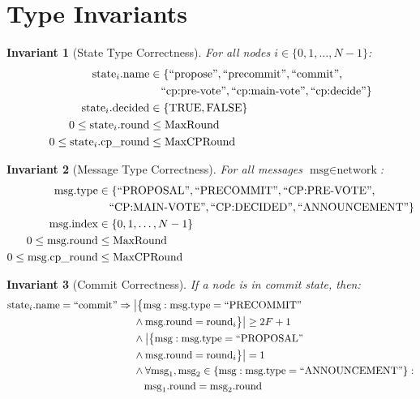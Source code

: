 \documentclass[11pt,a4paper,twoside]{article}
\newtheorem{invariant}{Invariant}[section]
\begin{document}
\section{Type Invariants}

\begin{invariant}[State Type Correctness]
For all nodes $i \in \{0, 1, \ldots, N-1\}$:
\begin{align}
\text{state}_i.\text{name} &\in \{\text{``propose''}, \text{``precommit''}, \text{``commit'',} \notag \\
& \quad \text{``cp:pre-vote''}, \text{``cp:main-vote''}, \text{``cp:decide''}\} \\
\text{state}_i.\text{decided} &\in \{\text{TRUE}, \text{FALSE}\} \\
0 \leq \text{state}_i.\text{round} &\leq \text{MaxRound} \\
0 \leq \text{state}_i.\text{cp\_round} &\leq \text{MaxCPRound}
\end{align}
\end{invariant}

\begin{invariant}[Message Type Correctness]
For all messages $\text{msg} \in \text{network}$:
\begin{align}
\text{msg.type} &\in \{\text{``PROPOSAL''}, \text{``PRECOMMIT''}, \text{``CP:PRE-VOTE'',} \notag \\
& \quad \text{``CP:MAIN-VOTE''}, \text{``CP:DECIDED''}, \text{``ANNOUNCEMENT''}\} \\
\text{msg.index} &\in \{0, 1, \ldots, N-1\} \\
0 \leq \text{msg.round} &\leq \text{MaxRound} \\
0 \leq \text{msg.cp\_round} &\leq \text{MaxCPRound}
\end{align}
\end{invariant}

\begin{invariant}[Commit Correctness]
If a node is in commit state, then:
\begin{align}
\text{state}_i.\text{name} = \text{``commit''} \Rightarrow {} & \big|\big\{\text{msg} : \text{msg.type} = \text{``PRECOMMIT''} \notag \\
& \land \text{msg.round} = \text{round}_i\big\}\big| \geq 2F + 1 \notag \\
& \land \big|\big\{\text{msg} : \text{msg.type} = \text{``PROPOSAL''} \notag \\
& \land \text{msg.round} = \text{round}_i\big\}\big| = 1 \notag \\
& \land \forall \text{msg}_1, \text{msg}_2 \in \{\text{msg} : \text{msg.type} = \text{``ANNOUNCEMENT''}\} : \notag \\
& \quad \text{msg}_1.\text{round} = \text{msg}_2.\text{round}
\end{align}
\end{invariant}
\end{document}
